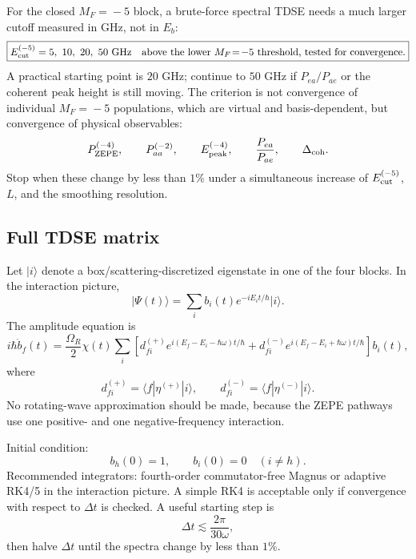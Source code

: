 \documentclass[11pt,a4paper]{article}
\newcommand{\MF}[1]{M_F\!=\!#1}
\newcommand{\ket}[1]{\lvert #1 \rangle}
\newcommand{\matel}[3]{\langle #1 | #2 | #3 \rangle}
\begin{document}
For the closed $\MF{-5}$ block, a brute-force spectral TDSE needs a much larger
cutoff measured in GHz, not in $E_b$:
\begin{equation}
\boxed{E_{\rm cut}^{(-5)}=5,\ 10,\ 20,\ 50\ {\rm GHz}\quad
\text{above the lower }\MF{-5}\text{ threshold, tested for convergence}.}
\end{equation}
A practical starting point is $20$ GHz; continue to $50$ GHz if
$P_{ea}/P_{ae}$ or the coherent peak height is still moving.  The criterion is
not convergence of individual $\MF{-5}$ populations, which are virtual and
basis-dependent, but convergence of physical observables:
\begin{equation}
P^{(-4)}_{\rm ZEPE},\qquad P^{(-2)}_{aa},\qquad
E_{\rm peak}^{(-4)},\qquad \frac{P_{ea}}{P_{ae}},\qquad \Delta_{\rm coh}.
\end{equation}
Stop when these change by less than $1\%$ under a simultaneous increase of
$E_{\rm cut}^{(-5)}$, $L$, and the smoothing resolution.

\subsection{Full TDSE matrix}

Let $\ket{i}$ denote a box/scattering-discretized eigenstate in one of the four
blocks.  In the interaction picture,
\begin{equation}
\ket{\Psi(t)}=\sum_i b_i(t)e^{-iE_i t/\hbar}\ket{i}.
\end{equation}
The amplitude equation is
\begin{equation}
\boxed{
 i\hbar\dot b_f(t)=\frac{\Omega_R}{2}\chi(t)
 \sum_i \left[
 d^{(+)}_{fi}e^{i(E_f-E_i-\hbar\omega)t/\hbar}
 +d^{(-)}_{fi}e^{i(E_f-E_i+\hbar\omega)t/\hbar}
 \right]b_i(t),}
\end{equation}
where
\begin{equation}
d^{(+)}_{fi}=\matel{f}{\eta^{(+)}}{i},\qquad d^{(-)}_{fi}=\matel{f}{\eta^{(-)}}{i}.
\end{equation}
No rotating-wave approximation should be made, because the ZEPE pathways use
one positive- and one negative-frequency interaction.

Initial condition:
\begin{equation}
b_h(0)=1,
\qquad b_i(0)=0\quad(i\ne h).
\end{equation}
Recommended integrators: fourth-order commutator-free Magnus or adaptive RK4/5
in the interaction picture.  A simple RK4 is acceptable only if convergence with
respect to $\Delta t$ is checked.  A useful starting step is
\begin{equation}
\Delta t \lesssim \frac{2\pi}{30\omega},
\end{equation}
then halve $\Delta t$ until the spectra change by less than $1\%$.
\end{document}
